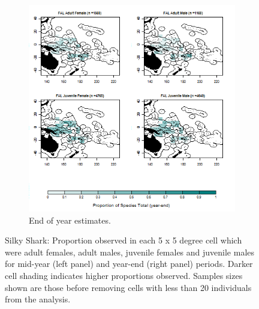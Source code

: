 \documentclass[12pt]{SCreport}
\begin{document}
\begin{landscape}
\begin{figure}
\begin{subfigure}[b]{0.6\textwidth}
       \includegraphics[width=\textwidth]{../GRAPHICS/Defined/BI_21_Map_maturity_sex_FAL}
       \caption{End of year estimates.}
       \label{fig:test2}
   \end{subfigure}
\caption{Silky Shark: Proportion observed in each 5 x 5 degree cell which were adult females, adult males, juvenile females and juvenile males for mid-year (left panel) and year-end (right panel) periods. Darker cell shading indicates higher proportions observed. Samples sizes shown are those before removing cells with less than 20 individuals from the analysis. }
\label{fig:test} 
\end{figure}
\end{landscape}
\end{document}
